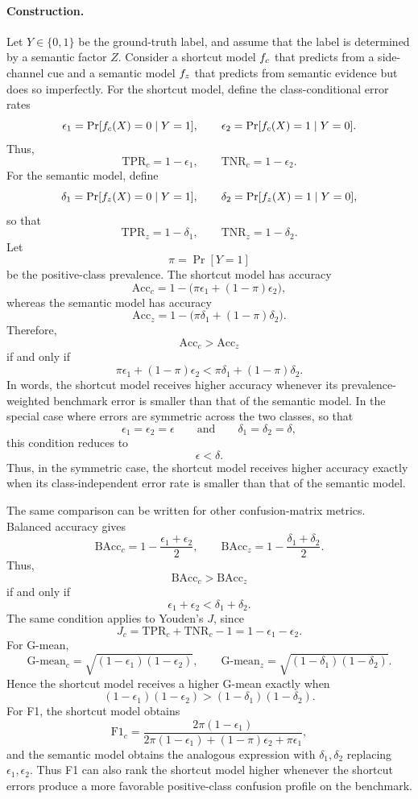 \documentclass[acmsmall,screen,review,anonymous]{acmart}
\begin{document}
\paragraph{Construction.}
Let \(Y\in\{0,1\}\) be the ground-truth label, and assume that the label is
determined by a semantic factor \(Z\). Consider a shortcut model
\(f_c\) that predicts from a side-channel cue and a semantic model
\(f_z\) that predicts from semantic evidence but does so imperfectly.
For the shortcut model, define the class-conditional error rates
\[
\epsilon_1
=
\Pr[f_c(X)=0 \mid Y=1],
\qquad
\epsilon_2
=
\Pr[f_c(X)=1 \mid Y=0].
\]
Thus,
\[
\mathrm{TPR}_c = 1-\epsilon_1,
\qquad
\mathrm{TNR}_c = 1-\epsilon_2.
\]
For the semantic model, define
\[
\delta_1
=
\Pr[f_z(X)=0 \mid Y=1],
\qquad
\delta_2
=
\Pr[f_z(X)=1 \mid Y=0],
\]
so that
\[
\mathrm{TPR}_z = 1-\delta_1,
\qquad
\mathrm{TNR}_z = 1-\delta_2.
\]
Let
\[
\pi=\Pr[Y=1]
\]
be the positive-class prevalence. The shortcut model has accuracy
\[
\mathrm{Acc}_c
=
1-\big(\pi\epsilon_1+(1-\pi)\epsilon_2\big),
\]
whereas the semantic model has accuracy
\[
\mathrm{Acc}_z
=
1-\big(\pi\delta_1+(1-\pi)\delta_2\big).
\]
Therefore,
\[
\mathrm{Acc}_c>\mathrm{Acc}_z
\]
if and only if
\[
\pi\epsilon_1+(1-\pi)\epsilon_2
<
\pi\delta_1+(1-\pi)\delta_2.
\]
In words, the shortcut model receives higher accuracy whenever its
prevalence-weighted benchmark error is smaller than that of the semantic
model. In the special case where errors are symmetric across the two classes,
so that
\[
\epsilon_1=\epsilon_2=\epsilon
\qquad\text{and}\qquad
\delta_1=\delta_2=\delta,
\]
this condition reduces to
\[
\epsilon < \delta.
\]
Thus, in the symmetric case, the shortcut model receives higher accuracy
exactly when its class-independent error rate is smaller than that of the
semantic model.

The same comparison can be written for other confusion-matrix metrics.
Balanced accuracy gives
\[
\mathrm{BAcc}_c
=
1-\frac{\epsilon_1+\epsilon_2}{2},
\qquad
\mathrm{BAcc}_z
=
1-\frac{\delta_1+\delta_2}{2}.
\]
Thus,
\[
\mathrm{BAcc}_c>\mathrm{BAcc}_z
\]
if and only if
\[
\epsilon_1+\epsilon_2 < \delta_1+\delta_2.
\]
The same condition applies to Youden's \(J\), since
\[
J_c
=
\mathrm{TPR}_c+\mathrm{TNR}_c-1
=
1-\epsilon_1-\epsilon_2.
\]
For G-mean,
\[
\mathrm{G\text{-}mean}_c
=
\sqrt{(1-\epsilon_1)(1-\epsilon_2)},
\qquad
\mathrm{G\text{-}mean}_z
=
\sqrt{(1-\delta_1)(1-\delta_2)}.
\]
Hence the shortcut model receives a higher G-mean exactly when
\[
(1-\epsilon_1)(1-\epsilon_2)
>
(1-\delta_1)(1-\delta_2).
\]
For F1, the shortcut model obtains
\[
\mathrm{F1}_c
=
\frac{2\pi(1-\epsilon_1)}
{2\pi(1-\epsilon_1)+(1-\pi)\epsilon_2+\pi\epsilon_1},
\]
and the semantic model obtains the analogous expression with
\(\delta_1,\delta_2\) replacing \(\epsilon_1,\epsilon_2\). Thus F1 can also
rank the shortcut model higher whenever the shortcut errors produce a more
favorable positive-class confusion profile on the benchmark.
\end{document}
